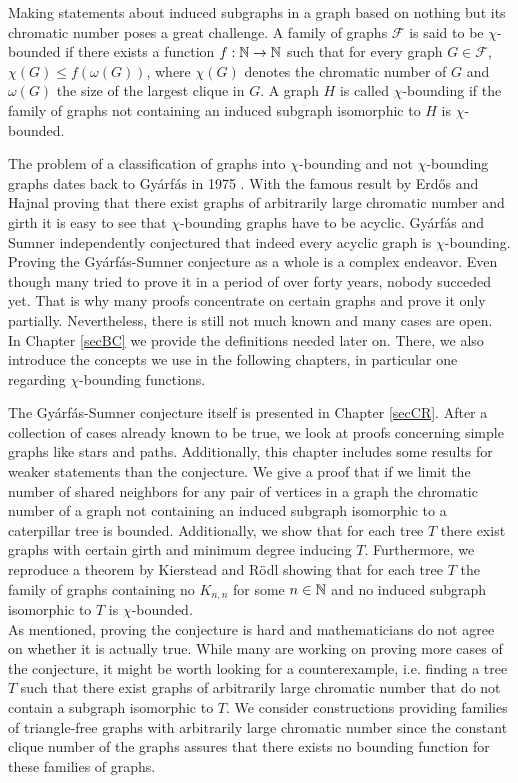 Making statements about induced subgraphs in a graph based on nothing but its chromatic number poses a great challenge. A family of graphs $\mathcal{F}$ is said to be $\chi$-bounded if there exists a function $f:\mathbb{N}\to\mathbb{N}$ such that for every graph $G\in\mathcal{F}$, $\chi (G)\leq f(\omega (G))$, where $\chi (G)$ denotes the chromatic number of $G$ and $\omega (G)$ the size of the largest clique in $G$. A graph $H$ is called $\chi$-bounding if the family of graphs not containing an induced subgraph isomorphic to $H$ is $\chi$-bounded.

The problem of a classification of graphs into $\chi$-bounding and not $\chi$-bounding graphs dates back to Gyárfás in 1975 \cite{Gy75}. With the famous result by Erd\H{o}s and Hajnal proving that there exist graphs of arbitrarily large chromatic number and girth it is easy to see that $\chi$-bounding graphs have to be acyclic. Gyárfás \cite{Gy75} and Sumner \cite{Su81} independently conjectured that indeed every acyclic graph is $\chi$-bounding. Proving the Gyárfás-Sumner conjecture as a whole is a complex endeavor. Even though many tried to prove it in a period of over forty years, nobody succeded yet. That is why many proofs concentrate on certain graphs and prove it only partially. Nevertheless, there is still not much known and many cases are open.
\\

In Chapter \ref{secBC} we provide the definitions needed later on. There, we also introduce the concepts we use in the following chapters, in particular one regarding $\chi$-bounding functions.

The Gyárfás-Sumner conjecture itself is presented in Chapter \ref{secCR}. After a collection of cases already known to be true, we look at proofs concerning simple graphs like stars and paths. Additionally, this chapter includes some results for weaker statements than the conjecture. We give a proof that if we limit the number of shared neighbors for any pair of vertices in a graph the chromatic number of a graph not containing an induced subgraph isomorphic to a caterpillar tree is bounded. Additionally, we show that for each tree $T$ there exist graphs with certain girth and minimum degree inducing $T$. Furthermore, we reproduce a theorem by Kierstead and Rödl \cite{Ki96} showing that for each tree $T$ the family of graphs containing no $K_{n,n}$ for some $n\in\mathbb{N}$ and no induced subgraph isomorphic to $T$ is $\chi$-bounded.
\\

As mentioned, proving the conjecture is hard and mathematicians do not agree on whether it is actually true. While many are working on proving more cases of the conjecture, it might be worth looking for a counterexample, i.e. finding a tree $T$ such that there exist graphs of arbitrarily large chromatic number that do not contain a subgraph isomorphic to $T$. We consider constructions providing families of triangle-free graphs with arbitrarily large chromatic number since the constant clique number of the graphs assures that there exists no bounding function for these families of graphs.

